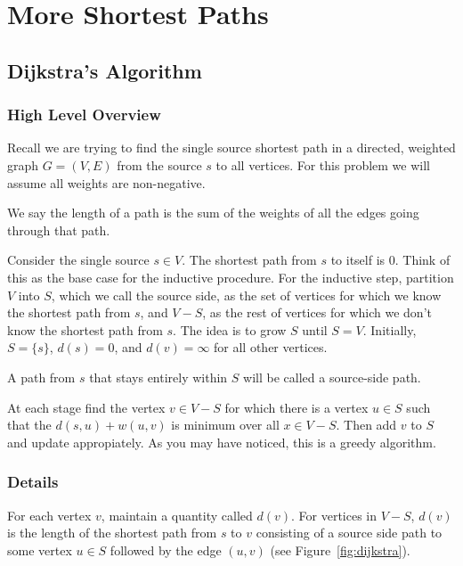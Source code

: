 
\section{More Shortest Paths}

\subsection{Dijkstra's Algorithm}

\subsubsection{High Level Overview}

Recall we are trying to find the single source shortest path in a directed, weighted graph $G = (V, E)$ from the source $s$ to all vertices. For this problem we will assume all weights are non-negative.

\begin{definition}
    We say the length of a path is the sum of the weights of all the edges going through that path.
\end{definition}

Consider the single source $s \in V$. The shortest path from $s$
to itself is 0. Think of this as the base case for the inductive
procedure. For the inductive step, partition $V$ into $S$, which we
call the source side, as the set of
vertices for which we know the shortest path from $s$, and $V - S$,
as the rest of vertices for which we don't know the shortest path from
$s$. The idea is to grow $S$ until $S = V$. Initially,
$S = \{s\}$, $d(s) = 0$, and $d(v) = \infty$ for all other vertices.

\begin{definition}
    A path from $s$ that stays entirely within $S$ will be
called a source-side path.
\end{definition}

At each stage find the vertex $v \in V - S$ for which there is a
vertex $u \in S$ such that the $d(s, u) + w(u, v)$ is minimum over all
$x \in V - S$. Then add $v$ to $S$ and update appropiately. As you may
have noticed, this is a greedy algorithm.

\subsubsection{Details}

For each vertex $v$, maintain a quantity called $d(v)$. For vertices
in $V - S$, $d(v)$ is the length of the shortest path from $s$ to $v$
consisting of a source side path to some vertex $u \in S$ followed by
the edge $(u, v)$ (see Figure~\ref{fig:dijkstra}).

